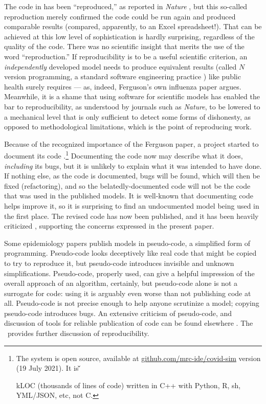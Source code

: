 The code in \cite{nature-summary,ICmodel} has been ``reproduced,'' as reported in \emph{Nature\/} \cite{codecheck,thumbs-up}, but this so-called reproduction merely confirmed the code could be run again and produced comparable results (compared, apparently, to an Excel spreadsheet!). That can be achieved at this low level of sophistication is hardly surprising, regardless of the quality of the code. There was no scientific insight that merits the use of the word ``reproduction.'' If reproducibility is to be a useful scientific criterion, an \emph{independently\/} developed model needs to produce equivalent results (called $N$ version programming, a standard software engineering practice \cite{NVP}) like public health surely requires --- as, indeed, Ferguson's own influenza paper \cite{nvp-ferguson} argues. Meanwhile, it is a shame that using software for scientific models has enabled the bar to reproducibility, as understood by journals such as \emph{Nature}, to be lowered to a mechanical level that is only sufficient to detect some forms of dishonesty, as opposed to methodological limitations, which is the point of reproducing work.

Because of the recognized importance of the Ferguson paper, a project started to document its code  \cite{refactoring}.\footnote{The system is open source, available at \url{github.com/mrc-ide/covid-sim} version (19 July 2021). It is
\newcount\u
\newcount\v
\newcount\w
\newcount\frac

kLOC (thousands of lines of code) written in C++ with Python, R, sh, YML/JSON, etc, not C\@.}
Documenting the code now may describe what it does, \emph{including\/} its bugs, but it is unlikely to explain what it was intended to have done. If nothing else, as the code is documented, bugs will be found, which will then be fixed (refactoring), and so the belatedly-documented code will not be the code that was used in the published models. It is well-known that documenting code helps improve it, so it is surprising to find an undocumented model being used in the first place. The revised code has now been published, and it has been heavily criticized , supporting the concerns expressed in the present paper.

Some epidemiology papers  publish models in pseudo-code, a simplified form of programming. Pseudo-code looks deceptively like real code that might be copied to try to reproduce it, but pseudo-code introduces invisible and unknown simplifications. Pseudo-code, properly used, can give a helpful impression of the overall approach of an algorithm, certainly, but pseudo-code alone is not a surrogate for code: using it is arguably even worse than not publishing code at all. Pseudo-code is not precise enough to help anyone scrutinize a model; copying pseudo-code introduces bugs. An extensive criticism of pseudo-code, and discussion of tools for reliable publication of code can be found elsewhere \cite{relit}. {The \supplement\ provides further discussion of reproducibility.}

